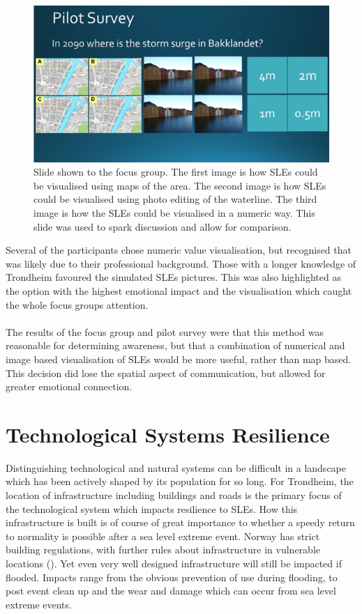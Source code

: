 \begin{figure}[H]
    \centering
    \includegraphics[width=1\textwidth]{fig_results/slide-pilot-survey.png}
    \caption{Slide shown to the focus group. The first image is how SLEs could be visualised using maps of the area. The second image is how SLEs could be visualised using photo editing of the waterline. The third image is how the SLEs could be visualised in a numeric way. This slide was used to spark discussion and allow for comparison.}
    \label{fig:slide}
\end{figure}

Several of the participants chose numeric value visualisation, but recognised that was likely due to their professional background. Those with a longer knowledge of Trondheim favoured the simulated SLEs pictures. This was also highlighted as the option with the highest emotional impact and the visualisation which caught the whole focus groups attention.

\paragraph{}

The results of the focus group and pilot survey were that this method was reasonable for determining awareness, but that a combination of numerical and image based visualisation of SLEs would be more useful, rather than map based. This decision did lose the spatial aspect of communication, but allowed for greater emotional connection.

\section{Technological Systems Resilience}

Distinguishing technological and natural systems can be difficult in a landscape which has been actively shaped by its population for so long. For Trondheim, the location of infrastructure including buildings and roads is the primary focus of the technological system which impacts resilience to SLEs. How this infrastructure is built is of course of great importance to whether a speedy return to normality is possible after a sea level extreme event. Norway has strict building regulations, with further rules about infrastructure in vulnerable locations (\cite{direktoratet_for_byggkvalitet_direktoratet_nodate}). Yet even very well designed infrastructure will still be impacted if flooded. Impacts range from the obvious  prevention of use during flooding, to post event clean up and the wear and damage which can occur from sea level extreme events.

